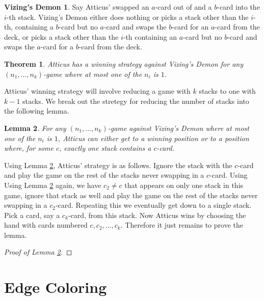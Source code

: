\documentclass[12pt]{article}
\theoremstyle{plain}
\newtheorem{thm}{Theorem}
\newtheorem{lem}[thm]{Lemma}
\theoremstyle{definition}
\newtheorem*{vizing_demon}{Vizing's Demon}
\theoremstyle{remark}
\newcommand{\parens}[1]{\left( #1 \right)}
\begin{document}
\begin{vizing_demon}
Say Atticus' swapped an $a$-card out of and a $b$-card into the $i$-th stack.
Vizing's Demon either does nothing or picks a stack other than the $i$-th, containing a $b$-card but no $a$-card and swaps the $b$-card for an $a$-card from the deck, or picks a stack other than the $i$-th containing an $a$-card but no $b$-card and swaps the $a$-card for a $b$-card from the deck.
\end{vizing_demon}

\begin{thm}
Atticus has a winning strategy against Vizing's Demon for any $\parens{n_1, \ldots,
n_k}$-game where at most one of the $n_i$ is $1$.
\end{thm}

Atticus' winning strategy will involve reducing a game with $k$ stacks to one with $k - 1$ stacks. We break out the stretegy for reducing the number of stacks into the following lemma.

\begin{lem}\label{Reduction}
For any $\parens{n_1, \ldots, n_k}$-game against Vizing's Demon where at most one of the $n_i$ is $1$, Atticus can either get to a winning position or to a position where, for some $c$, exactly one stack contains a $c$-card.
\end{lem}

Using Lemma \ref{Reduction}, Atticus' strategy is as follows.  Ignore the stack with the $c$-card and play the game on the rest of the stacks never swapping in a $c$-card.  Using Using Lemma \ref{Reduction} again, we have $c_2 \neq c$ that appears on only one stack in this game, ignore that stack as well and play the game on the rest of the stacks never swapping in a $c_2$-card.  Repeating this we eventually get down to a single stack.  Pick a card, say a $c_k$-card, from this stack.  Now Atticus wins by choosing the hand with cards numbered $c, c_2, \ldots, c_k$.  Therefore it just remains to prove the lemma.

\begin{proof}[Proof of Lemma \ref{Reduction}]
\end{proof}

\section{Edge Coloring}



\end{document}
